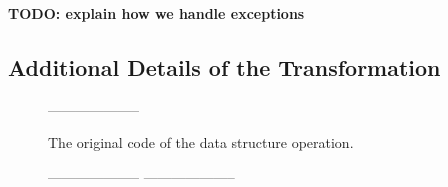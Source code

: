 \textbf{TODO: explain how we handle exceptions}

\subsection{Additional Details of the Transformation}\label{ssec:extendedTran}



\begin{figure*}
\scriptsize
	\begin{center}
	\begin{subfigure}[t]{.3\textwidth}
		\begin{algorithmic}[0]{}
		{\ttfamily
			 \label{codeXXX:aaaaa}
            \Statex --------------------
            \State\hspace{-3mm}{1 :\ x.lock()}
            \State\hspace{-3mm}{2 :\ if i>7  then}
            \State\hspace{-3mm}{3 :\ \ \ x.f2 = i}
            \State\hspace{-3mm}{4 :\ temp = x.f1 + x.f2}
            \State\hspace{-3mm}{5 :\ x.unlock()}
            \State\hspace{-3mm}{6 :\ return temp}
            \Statex
            \State
            \State
            \State
            \State
            \State
            \State
			\EndFunction
			}
		\end{algorithmic}
		\caption{The original code of the data structure operation.} \label{figure:autoPartitioning:step1}
	\end{subfigure}
	\begin{subfigure}[t]{.3\textwidth}
		\begin{algorithmic}[0]{}
		{\ttfamily
			 \label{codeXXX:aaaaa}
            \Statex --------------------
            \State\hspace{-3mm}{1 :\ x.lock()}
            \State\hspace{-3mm}{2 :\ if i>7  then}
            \State\hspace{-3mm}{3 :\ \ \ x.f2 = i}
            \State\hspace{-3mm}{4 :\ temp = x.f1 + x.f2}
            \State\hspace{-3mm}{5 :\ x.unlock()}
            \State\hspace{-3mm}{6 :\ return temp}
            \Statex --------------------
            \State\hspace{-3mm}{1':\ x.lock()}
}
\end{algorithmic}
\end{subfigure}
\end{center}
\end{figure*}
